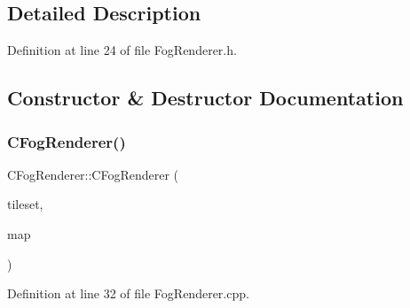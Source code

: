 \subsection{Detailed Description}


Definition at line 24 of file Fog\+Renderer.\+h.



\subsection{Constructor \& Destructor Documentation}
\hypertarget{classCFogRenderer_aa802bea4a0983b7cbcacf4ebfc1cf6a3}{}\label{classCFogRenderer_aa802bea4a0983b7cbcacf4ebfc1cf6a3} 
\subsubsection{\texorpdfstring{C\+Fog\+Renderer()}{CFogRenderer()}}
{\footnotesize\ttfamily C\+Fog\+Renderer\+::\+C\+Fog\+Renderer (\begin{DoxyParamCaption}\item[{std\+::shared\+\_\+ptr$<$ \hyperlink{classCGraphicTileset}{C\+Graphic\+Tileset} $>$}]{tileset,  }\item[{std\+::shared\+\_\+ptr$<$ \hyperlink{classCVisibilityMap}{C\+Visibility\+Map} $>$}]{map }\end{DoxyParamCaption})}



Definition at line 32 of file Fog\+Renderer.\+cpp.


